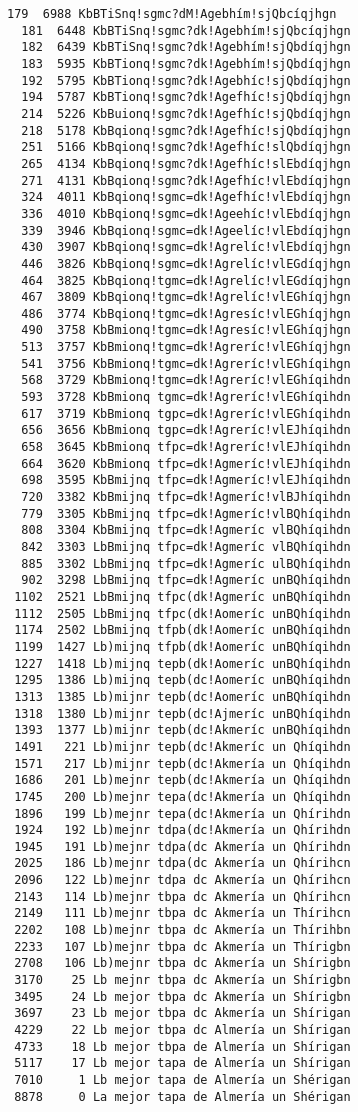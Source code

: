 \documentclass[11pt]{article}
\begin{document}
\begin{Verbatim}[commandchars=\\\{\}]
  179  6988 KbBTiSnq!sgmc?dM!Agebhím!sjQbcíqjhgn
  181  6448 KbBTiSnq!sgmc?dk!Agebhím!sjQbcíqjhgn
  182  6439 KbBTiSnq!sgmc?dk!Agebhím!sjQbdíqjhgn
  183  5935 KbBTionq!sgmc?dk!Agebhím!sjQbdíqjhgn
  192  5795 KbBTionq!sgmc?dk!Agebhíc!sjQbdíqjhgn
  194  5787 KbBTionq!sgmc?dk!Agefhíc!sjQbdíqjhgn
  214  5226 KbBuionq!sgmc?dk!Agefhíc!sjQbdíqjhgn
  218  5178 KbBqionq!sgmc?dk!Agefhíc!sjQbdíqjhgn
  251  5166 KbBqionq!sgmc?dk!Agefhíc!slQbdíqjhgn
  265  4134 KbBqionq!sgmc?dk!Agefhíc!slEbdíqjhgn
  271  4131 KbBqionq!sgmc?dk!Agefhíc!vlEbdíqjhgn
  324  4011 KbBqionq!sgmc=dk!Agefhíc!vlEbdíqjhgn
  336  4010 KbBqionq!sgmc=dk!Ageehíc!vlEbdíqjhgn
  339  3946 KbBqionq!sgmc=dk!Ageelíc!vlEbdíqjhgn
  430  3907 KbBqionq!sgmc=dk!Agrelíc!vlEbdíqjhgn
  446  3826 KbBqionq!sgmc=dk!Agrelíc!vlEGdíqjhgn
  464  3825 KbBqionq!tgmc=dk!Agrelíc!vlEGdíqjhgn
  467  3809 KbBqionq!tgmc=dk!Agrelíc!vlEGhíqjhgn
  486  3774 KbBqionq!tgmc=dk!Agresíc!vlEGhíqjhgn
  490  3758 KbBmionq!tgmc=dk!Agresíc!vlEGhíqjhgn
  513  3757 KbBmionq!tgmc=dk!Agreríc!vlEGhíqjhgn
  541  3756 KbBmionq!tgmc=dk!Agreríc!vlEGhíqihgn
  568  3729 KbBmionq!tgmc=dk!Agreríc!vlEGhíqihdn
  593  3728 KbBmionq tgmc=dk!Agreríc!vlEGhíqihdn
  617  3719 KbBmionq tgpc=dk!Agreríc!vlEGhíqihdn
  656  3656 KbBmionq tgpc=dk!Agreríc!vlEJhíqihdn
  658  3645 KbBmionq tfpc=dk!Agreríc!vlEJhíqihdn
  664  3620 KbBmionq tfpc=dk!Agmeríc!vlEJhíqihdn
  698  3595 KbBmijnq tfpc=dk!Agmeríc!vlEJhíqihdn
  720  3382 KbBmijnq tfpc=dk!Agmeríc!vlBJhíqihdn
  779  3305 KbBmijnq tfpc=dk!Agmeríc!vlBQhíqihdn
  808  3304 KbBmijnq tfpc=dk!Agmeríc vlBQhíqihdn
  842  3303 LbBmijnq tfpc=dk!Agmeríc vlBQhíqihdn
  885  3302 LbBmijnq tfpc=dk!Agmeríc ulBQhíqihdn
  902  3298 LbBmijnq tfpc=dk!Agmeríc unBQhíqihdn
 1102  2521 LbBmijnq tfpc(dk!Agmeríc unBQhíqihdn
 1112  2505 LbBmijnq tfpc(dk!Aomeríc unBQhíqihdn
 1174  2502 LbBmijnq tfpb(dk!Aomeríc unBQhíqihdn
 1199  1427 Lb)mijnq tfpb(dk!Aomeríc unBQhíqihdn
 1227  1418 Lb)mijnq tepb(dk!Aomeríc unBQhíqihdn
 1295  1386 Lb)mijnq tepb(dc!Aomeríc unBQhíqihdn
 1313  1385 Lb)mijnr tepb(dc!Aomeríc unBQhíqihdn
 1318  1380 Lb)mijnr tepb(dc!Ajmeríc unBQhíqihdn
 1393  1377 Lb)mijnr tepb(dc!Akmeríc unBQhíqihdn
 1491   221 Lb)mijnr tepb(dc!Akmeríc un Qhíqihdn
 1571   217 Lb)mijnr tepb(dc!Akmería un Qhíqihdn
 1686   201 Lb)mejnr tepb(dc!Akmería un Qhíqihdn
 1745   200 Lb)mejnr tepa(dc!Akmería un Qhíqihdn
 1896   199 Lb)mejnr tepa(dc!Akmería un Qhírihdn
 1924   192 Lb)mejnr tdpa(dc!Akmería un Qhírihdn
 1945   191 Lb)mejnr tdpa(dc Akmería un Qhírihdn
 2025   186 Lb)mejnr tdpa(dc Akmería un Qhírihcn
 2096   122 Lb)mejnr tdpa dc Akmería un Qhírihcn
 2143   114 Lb)mejnr tbpa dc Akmería un Qhírihcn
 2149   111 Lb)mejnr tbpa dc Akmería un Thírihcn
 2202   108 Lb)mejnr tbpa dc Akmería un Thírihbn
 2233   107 Lb)mejnr tbpa dc Akmería un Thírigbn
 2708   106 Lb)mejnr tbpa dc Akmería un Shírigbn
 3170    25 Lb mejnr tbpa dc Akmería un Shírigbn
 3495    24 Lb mejor tbpa dc Akmería un Shírigbn
 3697    23 Lb mejor tbpa dc Akmería un Shírigan
 4229    22 Lb mejor tbpa dc Almería un Shírigan
 4733    18 Lb mejor tbpa de Almería un Shírigan
 5117    17 Lb mejor tapa de Almería un Shírigan
 7010     1 Lb mejor tapa de Almería un Shérigan
 8878     0 La mejor tapa de Almería un Shérigan


\end{Verbatim}
\end{document}
